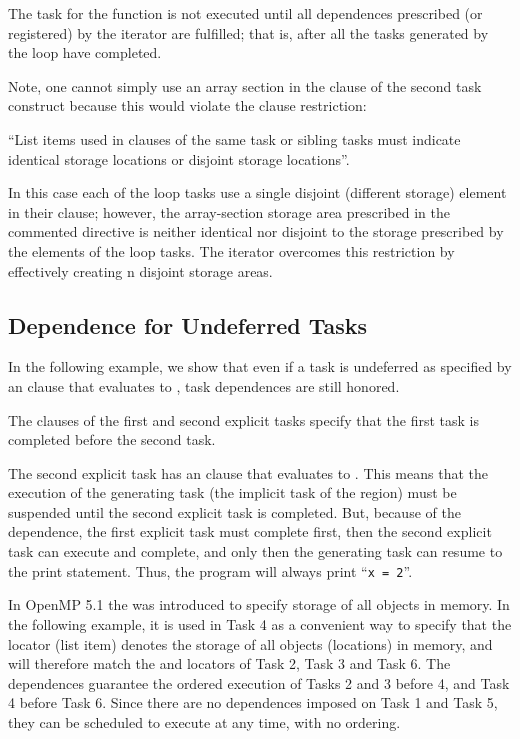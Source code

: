 The task for the  function is not executed until all dependences
prescribed (or registered) by the iterator are fulfilled; that is,
after all the tasks generated by the loop have completed.

Note, one cannot simply use an array section in the  clause
of the second task construct because this would violate the  clause restriction:

``List items used in  clauses of the same task or sibling tasks
must indicate identical storage locations or disjoint storage locations''.

In this case each of the loop tasks use a single disjoint (different storage)
element in their  clause; however,
the array-section storage area prescribed in the commented directive is neither
identical nor disjoint to the storage prescribed by the elements of the
loop tasks.  The iterator overcomes this restriction by effectively
creating n disjoint storage areas.



\subsection{Dependence for Undeferred Tasks}
\label{subsec:depend_undefer_task}

In the following example, we show that even if a task is undeferred as specified
by an  clause that evaluates to , task dependences are
still honored.

The  clauses of the first and second explicit tasks specify that
the first task is completed before the second task.

The second explicit task has an  clause that evaluates to .
This means that the execution of the generating task (the implicit task of
the  region) must be suspended until the second explicit task
is completed.
But, because of the dependence, the first explicit task must complete first,
then the second explicit task can execute and complete, and only then 
the generating task can resume to the print statement.
Thus, the program will always print ``\texttt{x = 2}''.

\clearpage



In OpenMP 5.1 the   was introduced
to specify storage of all objects in memory. In the following example,
it is used in Task 4 as a convenient way to specify that the locator
(list item) denotes the storage of all objects (locations) in memory, and 
will therefore match the  and  locators of Task 2, Task 3 and Task 6.
The dependences guarantee the ordered execution of Tasks 2 and 3 before 4, and
Task 4 before Task 6.
Since there are no dependences imposed on Task 1 and Task 5, they can be
scheduled to execute at any time, with no ordering.

